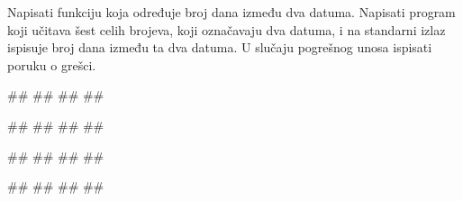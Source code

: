 \begin{Exercise}[label=p1.4_] 
Napisati funkciju  koja određuje broj
dana između dva datuma. Napisati program koji učitava šest celih
brojeva, koji označavaju dva datuma, i na standarni izlaz ispisuje
broj dana između ta dva datuma. U slučaju pogrešnog unosa ispisati
poruku o grešci.

\begin{miditest}
\begin{upotreba}{1}
#\naslovInt#
##
##
##
\end{upotreba}
\end{miditest}
\begin{miditest}
\begin{upotreba}{2}
#\naslovInt#
##
##
##
\end{upotreba}
\end{miditest}

\begin{miditest}
\begin{upotreba}{3}
#\naslovInt#
##
##
##
\end{upotreba}
\end{miditest}
\begin{miditest}
\begin{upotreba}{4}
#\naslovInt#
##
##
##
\end{upotreba}
\end{miditest}

\end{Exercise}
\begin{Answer}[ref=p1.4_]
\end{Answer}

